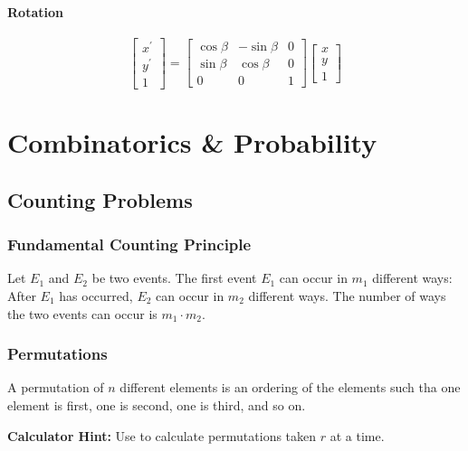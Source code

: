 \paragraph{Rotation}
\begin{equation}
	\left[\begin{array}{l}{x^{\prime}} \\ {y^{\prime}} \\ {1}\end{array}\right]=\left[\begin{array}{ccc}{\cos \beta} & {-\sin \beta} & {0} \\ {\sin \beta} & {\cos \beta} & {0} \\ {0} & {0} & {1}\end{array}\right]\left[\begin{array}{l}{x} \\ {y} \\ {1}\end{array}\right]
\end{equation}


\section{Combinatorics \& Probability}
\subsection{Counting Problems}
\subsubsection{Fundamental Counting Principle}

Let \(E_{1}\) and \(E_{2}\) be two events. The first event \(E_{1}\) can occur in \(m_{1}\) different ways:
After \(E_{1}\) has occurred, \(E_{2}\) can occur in \(m_{2}\) different ways. The number of ways
the two events can occur is \(m_{1} \cdot m_{2}\).

\subsubsection{Permutations}
A permutation of \(n\) different elements is an ordering of the elements such tha
one element is first, one is second, one is third, and so on.

\begin{mdframed}
\textbf{Calculator Hint:} Use  to calculate permutations taken \(r\) at a time.
\end{mdframed}

